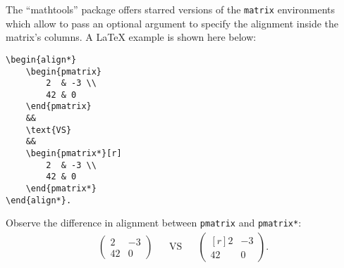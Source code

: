 	The \enquote{mathtools} package offers starred versions of the \texttt{matrix} environments which allow to pass an optional argument to specify the alignment inside the matrix's columns.
	A \LaTeX{} example is shown here below:
\begin{lstlisting}[language={[LaTeX]TeX}]
\begin{align*}
	\begin{pmatrix}
		2  & -3 \\
		42 & 0
	\end{pmatrix}
	&&
	\text{VS}
	&&
	\begin{pmatrix*}[r]
		2  & -3 \\
		42 & 0
	\end{pmatrix*}
\end{align*}.
\end{lstlisting}
	Observe the difference in alignment between \texttt{pmatrix} and \texttt{pmatrix*}:
	\begin{align*}
		\begin{pmatrix}
		2  & -3 \\
		42 & 0
		\end{pmatrix}
		&&
		\text{VS}
		&&
		\begin{pmatrix*}[r]
		2  & -3 \\
		42 & 0
		\end{pmatrix*}.
	\end{align*}


